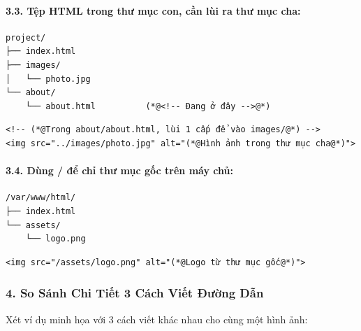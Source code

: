 \paragraph{3.3. Tệp HTML trong thư mục con, cần lùi ra thư mục cha:}

\begin{codeWindow}
\begin{lstlisting}[language=HTML5]
project/
├── index.html
├── images/
│   └── photo.jpg
└── about/
    └── about.html          (*@<!-- Đang ở đây -->@*)
\end{lstlisting}
\end{codeWindow}

\begin{codeWindow}
\begin{lstlisting}[language=HTML5]
<!-- (*@Trong about/about.html, lùi 1 cấp để vào images/@*) -->
<img src="../images/photo.jpg" alt="(*@Hình ảnh trong thư mục cha@*)">
\end{lstlisting}
\end{codeWindow}

\paragraph{3.4. Dùng / để chỉ thư mục gốc trên máy chủ:}

\begin{codeWindow}
\begin{lstlisting}[language=HTML5]
/var/www/html/
├── index.html
└── assets/
    └── logo.png
\end{lstlisting}
\end{codeWindow}

\begin{codeWindow}
\begin{lstlisting}[language=HTML5]
<img src="/assets/logo.png" alt="(*@Logo từ thư mục gốc@*)">
\end{lstlisting}
\end{codeWindow}

\subsubsection{4. So Sánh Chi Tiết 3 Cách Viết Đường Dẫn}

Xét ví dụ minh họa với 3 cách viết khác nhau cho cùng một hình ảnh:


